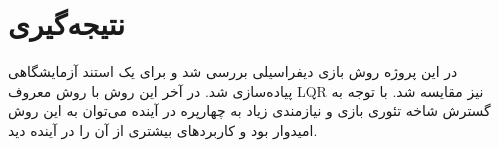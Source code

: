 \chapter{نتیجه‌گیری}
 در این پروژه روش بازی دیفراسیلی بررسی شد و برای یک استند آزمایشگاهی پیاده‌سازی شد. در آخر این روش با روش معروف LQR نیز مقایسه شد. با توجه به گسترش شاخه تئوری بازی و نیازمندی زیاد به چهارپره در آینده می‌توان به این روش امیدوار بود و کاربرد‌های بیشتری از آن را در آینده دید.